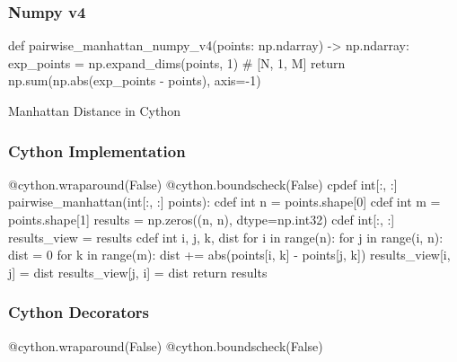 \documentclass{beamer}
\begin{document}
\begin{frame}[fragile]
\frametitle{Numpy v4}

    \begin{pythoncode}
def pairwise_manhattan_numpy_v4(points: np.ndarray) -> np.ndarray:
    exp_points = np.expand_dims(points, 1)  # [N, 1, M]
    return np.sum(np.abs(exp_points - points), axis=-1)
    \end{pythoncode}
\end{frame}

\begin{section}{Manhattan Distance in Cython}

\begin{frame}[fragile]
\frametitle{Cython Implementation}
    \begin{cythoncode}
@cython.wraparound(False)
@cython.boundscheck(False)
cpdef int[:, :] pairwise_manhattan(int[:, :] points):
    cdef int n = points.shape[0]
    cdef int m = points.shape[1]
    results = np.zeros((n, n), dtype=np.int32)
    cdef int[:, :] results_view = results
    cdef int i, j, k, dist
    for i in range(n):
        for j in range(i, n):
            dist = 0
            for k in range(m):
                dist += abs(points[i, k] - points[j, k])
            results_view[i, j] = dist
            results_view[j, i] = dist
    return results

    \end{cythoncode}
\end{frame}

\begin{frame}[fragile]
\frametitle{Cython Decorators}
    \begin{cythoncode}
@cython.wraparound(False)
@cython.boundscheck(False)
    \end{cythoncode}
\end{frame}

\end{section}
\end{document}
